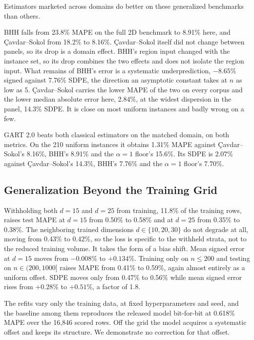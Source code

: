 \documentclass{article}
\begin{document}
Estimators marketed across domains do better on these generalized benchmarks than others.

BHH falls from 23.8\% MAPE on the full 2D benchmark to 8.91\% here, and \c{C}avdar--Sokol from 18.2\% to 8.16\%. \c{C}avdar--Sokol itself did not change between panels, so its drop is a domain effect. BHH's region input changed with the instance set, so its drop combines the two effects and does not isolate the region input. What remains of BHH's error is a systematic underprediction, $-8.65$\% signed against 7.76\% SDPE, the direction an asymptotic constant takes at $n$ as low as 5. \c{C}avdar--Sokol carries the lower MAPE of the two on every corpus and the lower median absolute error here, 2.84\%, at the widest dispersion in the panel, 14.3\% SDPE. It is close on most uniform instances and badly wrong on a few.

GART 2.0 beats both classical estimators on the matched domain, on both metrics. On the 210 uniform instances it obtains 1.31\% MAPE against \c{C}avdar--Sokol's 8.16\%, BHH's 8.91\% and the $\alpha=1$ floor's 15.6\%. Its SDPE is 2.07\% against \c{C}avdar--Sokol's 14.3\%, BHH's 7.76\% and the $\alpha=1$ floor's 7.70\%. 

\subsection{Generalization Beyond the Training Grid} \label{subsec:generalization}


Withholding both $d=15$ and $d=25$ from training, 11.8\% of the training rows, raises test MAPE at $d=15$ from 0.50\% to 0.58\% and at $d=25$ from 0.35\% to 0.38\%. The neighboring trained dimensions $d\in\{10,20,30\}$ do not degrade at all, moving from 0.43\% to 0.42\%, so the loss is specific to the withheld strata, not to the reduced training volume. It takes the form of a bias shift. Mean signed error at $d=15$ moves from $-0.008$\% to $+0.134$\%. Training only on $n\le200$ and testing on $n\in(200,1000]$ raises MAPE from 0.41\% to 0.59\%, again almost entirely as a uniform offset. SDPE moves only from 0.47\% to 0.56\% while mean signed error rises from $+0.28$\% to $+0.51$\%, a factor of 1.8.

The refits vary only the training data, at fixed hyperparameters and seed, and the baseline among them reproduces the released model bit-for-bit at 0.618\% MAPE over the 16{,}846 scored rows. Off the grid the model acquires a systematic offset and keeps its structure. We demonstrate no correction for that offset. 
\end{document}
